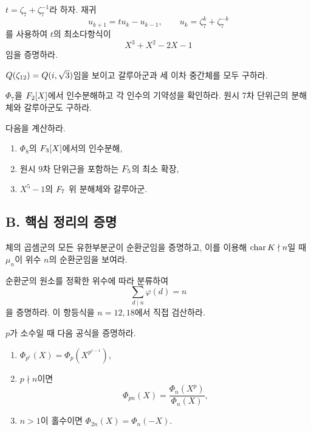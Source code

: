\begin{exercise}[*]
$t=\zeta_7+\zeta_7^{-1}$라 하자. 재귀
\[
  u_{k+1}=tu_k-u_{k-1},
  \qquad u_k=\zeta_7^k+\zeta_7^{-k}
\]
를 사용하여 $t$의 최소다항식이
\[
  X^3+X^2-2X-1
\]
임을 증명하라.
\end{exercise}

\begin{exercise}
$Q(\zeta_{12})=Q(i,\sqrt3)$임을 보이고 갈루아군과 세 이차 중간체를 모두 구하라.
\end{exercise}

\begin{exercise}[*]
$\Phi_7$을 $F_2[X]$에서 인수분해하고 각 인수의 기약성을 확인하라. 원시 $7$차 단위근의 분해체와 갈루아군도 구하라.
\end{exercise}

\begin{exercise}
다음을 계산하라.
\begin{enumerate}[label=(\alph*)]
  \item $\Phi_8$의 $F_3[X]$에서의 인수분해,
  \item 원시 $9$차 단위근을 포함하는 $F_5$의 최소 확장,
  \item $X^5-1$의 $F_7$ 위 분해체와 갈루아군.
\end{enumerate}
\end{exercise}

\subsection*{B. 핵심 정리의 증명}

\begin{exercise}
체의 곱셈군의 모든 유한부분군이 순환군임을 증명하고, 이를 이용해 $\operatorname{char} K\nmid n$일 때 $\mu_n$이 위수 $n$의 순환군임을 보여라.
\end{exercise}

\begin{exercise}[*]
순환군의 원소를 정확한 위수에 따라 분류하여
\[
  \sum_{d\mid n}\varphi(d)=n
\]
을 증명하라. 이 항등식을 $n=12,18$에서 직접 검산하라.
\end{exercise}

\begin{exercise}
$p$가 소수일 때 다음 공식을 증명하라.
\begin{enumerate}[label=(\alph*)]
  \item $\Phi_{p^r}(X)=\Phi_p(X^{p^{r-1}})$,
  \item $p\nmid n$이면
  \[
    \Phi_{pn}(X)=\frac{\Phi_n(X^p)}{\Phi_n(X)},
  \]
  \item $n>1$이 홀수이면 $\Phi_{2n}(X)=\Phi_n(-X)$.
\end{enumerate}
\end{exercise}

